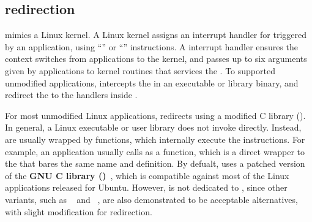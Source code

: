 \subsection{\Linuxapi{} redirection}


\thelibos{} mimics a Linux kernel. A Linux kernel assigns an interrupt handler for \linuxapis{} triggered by an application, using ``'' or ``'' instructions.
A \linuxapi{} interrupt handler
ensures the context switches from applications to the kernel,
and passes up to six \linuxapi{} arguments given by applications to kernel routines that services the \linuxapis{}.
To supported unmodified applications,
\thelibos{}
intercepts the \linuxapis{}
in an executable or library binary, and redirect the \linuxapis{}
to the \linuxapi{} handlers inside \thelibos{}.


For most unmodified Linux applications,
\thelibos{} redirects \linuxapis{} using a modified C library (\libc{}).
In general,  a Linux executable or user library does not invoke \linuxapis{} directly.
Instead, \linuxapis{}
are usually wrapped by \libc{} functions,
which internally execute the  instructions.
For example, an application usually calls  as a \libc{} function, which is a direct wrapper to the \linuxapi{} that bares the same name and definition.
By defualt,
\thelibos{} uses a patched version
of the {\bf GNU C library (\glibc{})}~\cite{glibc},
which is compatible against most of the Linux applications released for Ubuntu.
However, \graphene{} is not dedicated to \glibc{}, since 
other \libc{} variants,
such as ~\cite{uclibc} and ~\cite{musl},
are also demonstrated
to be acceptable alternatives,
with slight modification for \linuxapi{} redirection.




